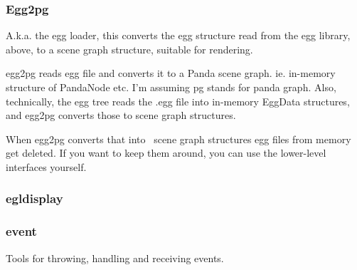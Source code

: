 \documentclass[a4paper]{article}
\begin{document}
\clearpage\subsubsection[Egg2pg]{Egg2pg}
\hypertarget{RefHeading21451167907073}{}{\color{black}
A.k.a. the {\textquotedbl}egg loader{\textquotedbl}, this converts the egg structure read from\newline
the egg library, above, to a scene graph structure, suitable for rendering.}

{\color{black}
egg2pg reads egg file and converts it to a Panda scene graph. \newline
ie. in-memory structure of PandaNode etc. \newline
I'm assuming {\textquotedbl}pg{\textquotedbl} stands for {\textquotedbl}panda graph{\textquotedbl}.\newline
Also, technically, the {\textquotedbl}egg{\textquotedbl} tree reads the .egg file into in-memory\newline
 EggData structures, and egg2pg converts those to scene graph structures.}

{\color{black}
When egg2pg converts that into \ scene graph structures egg files\newline
from memory get deleted. If you want to keep them around, you can use\newline
 the lower-level interfaces yourself.}

\clearpage\subsubsection[egldisplay]{egldisplay}
\hypertarget{RefHeading21471167907073}{}\subsubsection{}
\clearpage\subsubsection[event]{event}
\hypertarget{RefHeading21491167907073}{}{\color{black}
Tools for throwing, handling and receiving events.}
\end{document}
